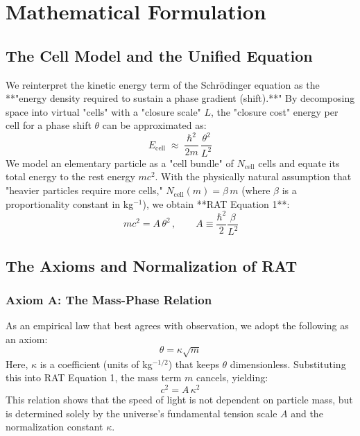 \documentclass[11pt,a4paper]{article}
\newcommand{\kappaR}{\kappa}
\newcommand{\betaC}{\beta}
\begin{document}
\section{Mathematical Formulation}
\subsection{The Cell Model and the Unified Equation}
We reinterpret the kinetic energy term of the Schrödinger equation as the **"energy density required to sustain a phase gradient (shift).**" By decomposing space into virtual "cells" with a "closure scale" $L$, the "closure cost" energy per cell for a phase shift $\theta$ can be approximated as:
\[ E_{\text{cell}}\;\approx\;\frac{\hbar^2}{2m}\,\frac{\theta^2}{L^2} \]
We model an elementary particle as a "cell bundle" of $N_{\text{cell}}$ cells and equate its total energy to the rest energy $mc^2$. With the physically natural assumption that "heavier particles require more cells," $N_{\text{cell}}(m) = \betaC\, m$ (where $\betaC$ is a proportionality constant in kg$^{-1}$), we obtain **RAT Equation 1**:
\begin{equation}
    \boxed{\,m c^2 = A\,\theta^2\,},\qquad A \equiv \frac{\hbar^2}{2}\frac{\betaC}{L^2}
\end{equation}
\subsection{The Axioms and Normalization of RAT}
\subsubsection*{Axiom A: The Mass-Phase Relation}
As an empirical law that best agrees with observation, we adopt the following as an axiom:
\begin{equation}
    \theta = \kappaR\sqrt{m}
\end{equation}
Here, $\kappaR$ is a coefficient (units of kg$^{-1/2}$) that keeps $\theta$ dimensionless. Substituting this into RAT Equation 1, the mass term $m$ cancels, yielding:
\begin{equation}
    \boxed{\,c^2 = A\,\kappaR^2\,}
\end{equation}
This relation shows that the speed of light is not dependent on particle mass, but is determined solely by the universe's fundamental tension scale $A$ and the normalization constant $\kappaR$.
\end{document}
